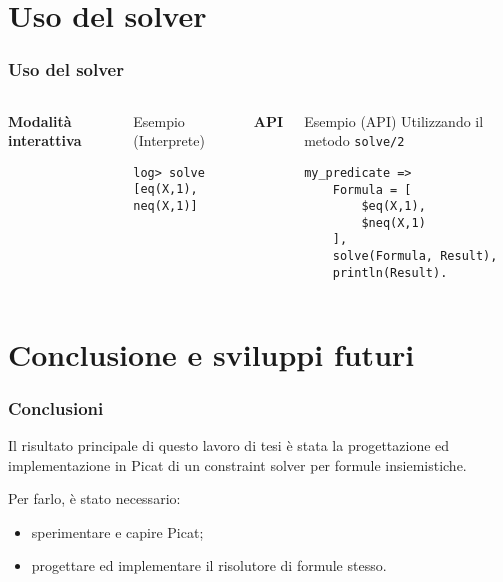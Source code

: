 \documentclass{beamer}
\begin{document}
\section{Uso del solver}

\begin{frame}[fragile]
  \frametitle{Uso del solver}
  \begin{columns}[c]
    \textbf{Modalità interattiva}
    \begin{exampleblock}{Esempio (Interprete)}
\begin{verbatim}
log> solve 
[eq(X,1), neq(X,1)]
\end{verbatim}
    \end{exampleblock}

    \textbf{API}
    \begin{exampleblock}{Esempio (API)}
      Utilizzando il metodo \texttt{solve/2}
\begin{verbatim}
my_predicate =>
    Formula = [ 
        $eq(X,1), 
        $neq(X,1) 
    ],
    solve(Formula, Result),
    println(Result).
\end{verbatim}
    \end{exampleblock}
  \end{columns}
\end{frame}

\section{Conclusione e sviluppi futuri}

\begin{frame}
  \frametitle{Conclusioni}
  Il risultato principale di questo lavoro di tesi è stata la progettazione ed implementazione in Picat di un constraint solver per formule insiemistiche.
  
  \bigskip
  
  Per farlo, è stato necessario:
  \begin{itemize}
  	\item sperimentare e capire Picat;
  	\item progettare ed implementare il risolutore di formule stesso.
  \end{itemize}
\end{frame}

\end{document}
